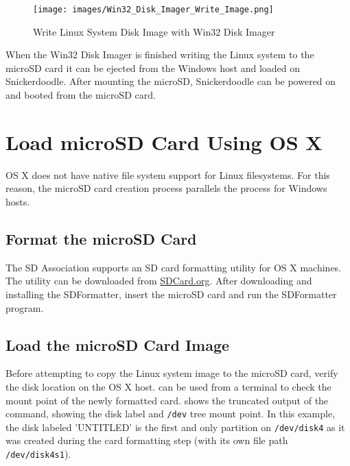 \begin{figure}
	\centering
	\texttt{[image: images/Win32\_Disk\_Imager\_Write\_Image.png]}
	\caption{Write Linux System Disk Image with Win32 Disk Imager}
	\label{fig:win32diskimagewrite}
\end{figure}


When the Win32 Disk Imager is finished writing the Linux system to the microSD card it can be ejected from the Windows host and loaded on Snickerdoodle. After mounting the microSD, Snickerdoodle can be powered on and booted from the microSD card. %

\section{Load microSD Card Using OS X}


OS X does not have native file system support for Linux filesystems. For this reason, the microSD card creation process parallels the process for Windows hosts. 


\subsection{Format the microSD Card}

The SD Association supports an SD card formatting utility for OS X machines. The utility can be downloaded from \href{https://www.sdcard.org/downloads/formatter_4}{SDCard.org}. After downloading and installing the SDFormatter, insert the microSD card and run the SDFormatter program. 





\subsection{Load the microSD Card Image}

Before attempting to copy the Linux system image to the microSD card, verify the disk location on the OS X host.  can be used from a terminal to check the mount point of the newly formatted card.  shows the truncated output of the  command, showing the disk label and \texttt{/dev} tree mount point. In this example, the disk labeled 'UNTITLED' is the first and only partition on \texttt{/dev/disk4} as it was created during the card formatting step (with its own file path \texttt{/dev/disk4s1}). 


